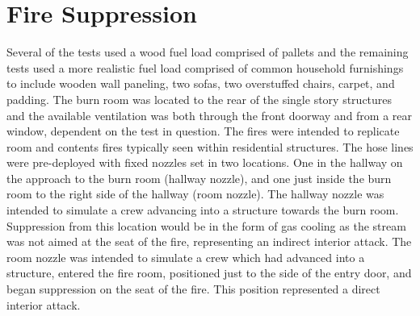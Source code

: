 \documentclass[12pt,oneside]{book}
\begin{document}
\section{Fire Suppression}
\label{sec:Fire_Suppression}	
Several of the tests used a wood fuel load comprised of pallets and the remaining tests used a more realistic fuel load comprised of common household furnishings to include wooden wall paneling, two sofas, two overstuffed chairs, carpet, and padding.  The burn room was located to the rear of the single story structures and the available ventilation was both through the front doorway and from a rear window, dependent on the test in question.  The fires were intended to replicate room and contents fires typically seen within residential structures.  The hose lines were pre-deployed with fixed nozzles set in two locations.  One in the hallway on the approach to the burn room (hallway nozzle), and one just inside the burn room to the right side of the hallway (room nozzle). The hallway nozzle was intended to simulate a crew advancing into a structure towards the burn room. Suppression from this location would be in the form of gas cooling as the stream was not aimed at the seat of the fire, representing an indirect interior attack. The room nozzle was intended to simulate a crew which had advanced into a structure, entered the fire room, positioned just to the side of the entry door, and began suppression on the seat of the fire.  This position represented a direct interior attack.
\end{document}
